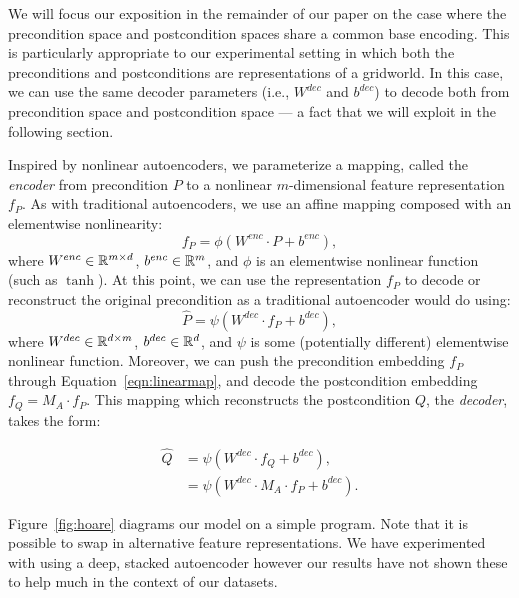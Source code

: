 We will focus our exposition in the remainder of our paper
on the case where the precondition space 
and postcondition spaces share a common base encoding.  This is particularly
appropriate to our experimental setting in which both the preconditions
and postconditions are representations of a gridworld.  In this case, we can use the same decoder parameters 
(i.e., $W^{dec}$ and $b^{dec}$) to decode both from precondition space and postcondition space
 --- a fact that we will exploit in the following section.  


Inspired by nonlinear autoencoders, we parameterize a mapping, called
the \emph{encoder} from 
precondition $P$ to a nonlinear $m$-dimensional
feature representation $f_P$.
As with traditional autoencoders, we use an affine mapping composed
with an elementwise nonlinearity:  
\begin{equation}\label{eqn:encodeprecondition}
f_P =  \phi(W^{enc}\cdot P + b^{enc}),
\end{equation}
where $W^{enc}\in\mathbb{R}^{m\times d}$, $b^{enc}\in \mathbb{R}^m$,
and $\phi$ is an elementwise nonlinear function (such as $\tanh$).
At this point, we can use the representation
$f_P$ to decode or reconstruct the original precondition as 
a traditional autoencoder would do using:
\begin{equation}\label{eqn:decodeprecondition}
\hat{P} =  \psi (W^{dec}\cdot f_P + b^{dec}),
\end{equation}
where $W^{dec}\in\mathbb{R}^{d\times m}$, $b^{dec}\in\mathbb{R}^{d}$,
and $\psi$ is some (potentially different) elementwise 
nonlinear function.
Moreover, we can push the precondition
embedding $f_P$ through Equation~\ref{eqn:linearmap}, and decode the
postcondition embedding $f_Q=M_A\cdot f_P$.  This mapping which reconstructs
the postcondition $Q$, the \emph{decoder}, takes the form:

{
\begin{align}
\hat{Q} &= \psi (W^{dec}\cdot f_Q + b^{dec}), \label{eqn:decodepostcondition}\\
    &= \psi (W^{dec}\cdot M_A\cdot f_P + b^{dec}).
\end{align}
}

Figure~\ref{fig:hoare} diagrams our model on a simple program.
Note that it is possible to swap in alternative feature representations.
We have experimented with using a deep, stacked autoencoder however our results have
not shown these to help much in the context of our datasets.

